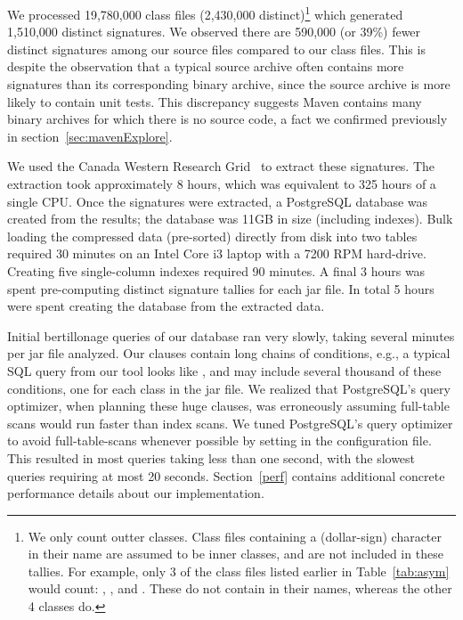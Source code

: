 We processed  19,780,000
class files (2,430,000  distinct)\footnote{We only count outter classes.
Class files containing a \mytt{\$} (dollar-sign) character in their name are assumed to be inner classes,
and are not included in these tallies.  For example, only 3 of the class files listed earlier in Table~\ref{tab:asym} would count:
, , and .  These do not contain
\mytt{\$} in their names, whereas the other 4 classes do.}
which generated  1,510,000
distinct signatures.  We observed there are 590,000 (or 39\%) fewer
distinct signatures among our source files compared to our class files.
This is despite the observation that a typical source archive often
contains more signatures than its corresponding binary archive, since the
source archive is more likely to contain unit tests.  This discrepancy
suggests Maven contains many binary archives for which there is no source
code, a fact we confirmed previously in section~\ref{sec:mavenExplore}.

We used the Canada Western Research Grid~\cite{WCRG} to extract these signatures. The
extraction took approximately 8 hours, which was equivalent to 325 hours of a
single CPU. Once the signatures were extracted, a PostgreSQL database was
created from the results; the database was 11GB in size (including indexes).
Bulk loading the compressed data (pre-sorted) directly from disk into two tables
required 30 minutes on an Intel Core i3 laptop with a 7200 RPM hard-drive.
Creating five single-column indexes required 90 minutes.
A final 3 hours was spent pre-computing distinct signature tallies
for each jar file.  In total 5 hours were spent creating the database from the
extracted data.

Initial bertillonage queries of our database ran very slowly, taking several minutes
per jar file analyzed.
Our  clauses contain long chains of  conditions, e.g., a typical
SQL query from our tool looks like
, and may include several thousand
of these  conditions,
one for each class in the jar file.
We realized that PostgreSQL's query optimizer, when planning these huge  clauses,
was erroneously assuming full-table scans would run faster than index scans.
We tuned PostgreSQL's query optimizer to avoid full-table-scans whenever
possible by setting  in the configuration file.
This resulted in most queries taking less than one second, with the slowest queries
requiring at most 20 seconds.  Section~\ref{perf} contains additional concrete
performance details about our implementation.



